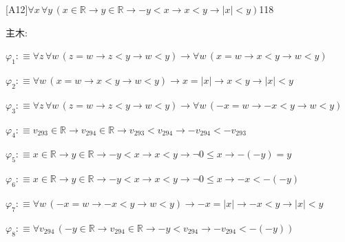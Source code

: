 \begin{fullproof}{[A12]}{$\forall x\,\forall y\,(x \in \mathbb{R} \to y \in \mathbb{R} \to -y < x \to x < y \to \lvert x \rvert < y)$}{118}
\begin{ptree}
\noLine
{}
\end{ptree}
\noindent 主木:
\begin{ptree}
\noLine
{}
\noLine
{}
\end{ptree}
\begin{abbrevlist}
\item $\varphi_{1} :\equiv \forall z\,\forall w\,(z = w \to z < y \to w < y) \to \forall w\,(x = w \to x < y \to w < y)$
\item $\varphi_{2} :\equiv \forall w\,(x = w \to x < y \to w < y) \to x = \lvert x \rvert \to x < y \to \lvert x \rvert < y$
\item $\varphi_{3} :\equiv \forall z\,\forall w\,(z = w \to z < y \to w < y) \to \forall w\,(-x = w \to -x < y \to w < y)$
\item $\varphi_{4} :\equiv v_{293} \in \mathbb{R} \to v_{294} \in \mathbb{R} \to v_{293} < v_{294} \to -v_{294} < -v_{293}$
\item $\varphi_{5} :\equiv x \in \mathbb{R} \to y \in \mathbb{R} \to -y < x \to x < y \to \neg 0 \leq x \to -(-y) = y$
\item $\varphi_{6} :\equiv x \in \mathbb{R} \to y \in \mathbb{R} \to -y < x \to x < y \to \neg 0 \leq x \to -x < -(-y)$
\item $\varphi_{7} :\equiv \forall w\,(-x = w \to -x < y \to w < y) \to -x = \lvert x \rvert \to -x < y \to \lvert x \rvert < y$
\item $\varphi_{8} :\equiv \forall v_{294}\,(-y \in \mathbb{R} \to v_{294} \in \mathbb{R} \to -y < v_{294} \to -v_{294} < -(-y))$

\end{abbrevlist}
\end{fullproof}
